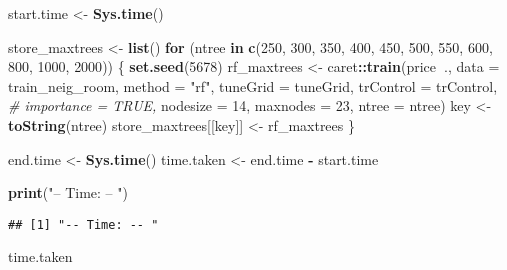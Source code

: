 \documentclass[
]{article}
\newenvironment{Shaded}{\begin{snugshade}}{\end{snugshade}}
\newcommand{\CommentTok}[1]{\textcolor[rgb]{0.56,0.35,0.01}{\textit{#1}}}
\newcommand{\ControlFlowTok}[1]{\textcolor[rgb]{0.13,0.29,0.53}{\textbf{#1}}}
\newcommand{\DataTypeTok}[1]{\textcolor[rgb]{0.13,0.29,0.53}{#1}}
\newcommand{\DecValTok}[1]{\textcolor[rgb]{0.00,0.00,0.81}{#1}}
\newcommand{\KeywordTok}[1]{\textcolor[rgb]{0.13,0.29,0.53}{\textbf{#1}}}
\newcommand{\NormalTok}[1]{#1}
\newcommand{\OperatorTok}[1]{\textcolor[rgb]{0.81,0.36,0.00}{\textbf{#1}}}
\newcommand{\StringTok}[1]{\textcolor[rgb]{0.31,0.60,0.02}{#1}}
\begin{document}
\begin{Shaded}
\begin{Highlighting}[]
\NormalTok{start.time <-}\StringTok{ }\KeywordTok{Sys.time}\NormalTok{()}

\NormalTok{store_maxtrees <-}\StringTok{ }\KeywordTok{list}\NormalTok{()}
\ControlFlowTok{for}\NormalTok{ (ntree }\ControlFlowTok{in} \KeywordTok{c}\NormalTok{(}\DecValTok{250}\NormalTok{, }\DecValTok{300}\NormalTok{, }\DecValTok{350}\NormalTok{, }\DecValTok{400}\NormalTok{, }\DecValTok{450}\NormalTok{, }\DecValTok{500}\NormalTok{, }\DecValTok{550}\NormalTok{, }\DecValTok{600}\NormalTok{, }\DecValTok{800}\NormalTok{, }\DecValTok{1000}\NormalTok{, }\DecValTok{2000}\NormalTok{)) \{}
  \KeywordTok{set.seed}\NormalTok{(}\DecValTok{5678}\NormalTok{)}
\NormalTok{  rf_maxtrees <-}\StringTok{ }\NormalTok{caret}\OperatorTok{::}\KeywordTok{train}\NormalTok{(price}\OperatorTok{~}\NormalTok{.,}
                       \DataTypeTok{data =}\NormalTok{ train_neig_room,}
                       \DataTypeTok{method =} \StringTok{"rf"}\NormalTok{,}
                       \DataTypeTok{tuneGrid =}\NormalTok{ tuneGrid,}
                       \DataTypeTok{trControl =}\NormalTok{ trControl,}
                      \CommentTok{# importance = TRUE,}
                       \DataTypeTok{nodesize =} \DecValTok{14}\NormalTok{,}
                       \DataTypeTok{maxnodes =} \DecValTok{23}\NormalTok{,}
                       \DataTypeTok{ntree =}\NormalTok{ ntree)}
\NormalTok{  key <-}\StringTok{ }\KeywordTok{toString}\NormalTok{(ntree)}
\NormalTok{  store_maxtrees[[key]] <-}\StringTok{ }\NormalTok{rf_maxtrees}
\NormalTok{\}}

\NormalTok{end.time <-}\StringTok{ }\KeywordTok{Sys.time}\NormalTok{()}
\NormalTok{time.taken <-}\StringTok{ }\NormalTok{end.time }\OperatorTok{-}\StringTok{ }\NormalTok{start.time}

\KeywordTok{print}\NormalTok{(}\StringTok{"-- Time: -- "}\NormalTok{)}
\end{Highlighting}
\end{Shaded}

\begin{verbatim}
## [1] "-- Time: -- "
\end{verbatim}

\begin{Shaded}
\begin{Highlighting}[]
\NormalTok{time.taken}
\end{Highlighting}
\end{Shaded}
\end{document}
